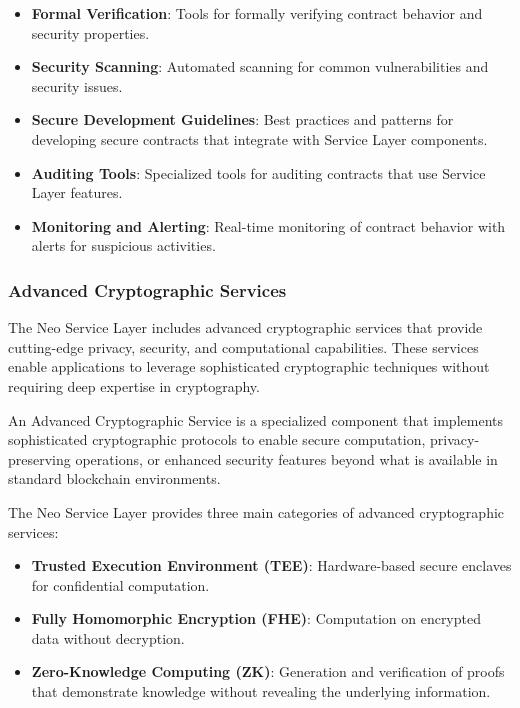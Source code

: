 \begin{itemize}
    \item \textbf{Formal Verification}: Tools for formally verifying contract behavior and security properties.
    
    \item \textbf{Security Scanning}: Automated scanning for common vulnerabilities and security issues.
    
    \item \textbf{Secure Development Guidelines}: Best practices and patterns for developing secure contracts that integrate with Service Layer components.
    
    \item \textbf{Auditing Tools}: Specialized tools for auditing contracts that use Service Layer features.
    
    \item \textbf{Monitoring and Alerting}: Real-time monitoring of contract behavior with alerts for suspicious activities.
\end{itemize}

\subsubsection{Advanced Cryptographic Services}
\label{subsubsec:advanced-crypto}

The Neo Service Layer includes advanced cryptographic services that provide cutting-edge privacy, security, and computational capabilities. These services enable applications to leverage sophisticated cryptographic techniques without requiring deep expertise in cryptography.



\begin{definition}
An Advanced Cryptographic Service is a specialized component that implements sophisticated cryptographic protocols to enable secure computation, privacy-preserving operations, or enhanced security features beyond what is available in standard blockchain environments.
\end{definition}

The Neo Service Layer provides three main categories of advanced cryptographic services:

\begin{itemize}
    \item \textbf{Trusted Execution Environment (TEE)}: Hardware-based secure enclaves for confidential computation.
    
    \item \textbf{Fully Homomorphic Encryption (FHE)}: Computation on encrypted data without decryption.
    
    \item \textbf{Zero-Knowledge Computing (ZK)}: Generation and verification of proofs that demonstrate knowledge without revealing the underlying information.
\end{itemize}

